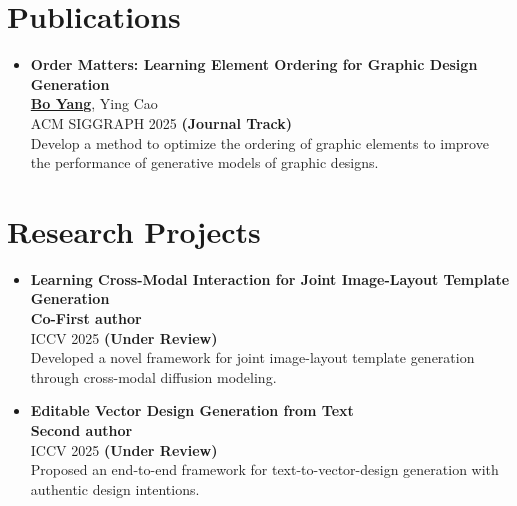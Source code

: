 \documentclass[letterpaper,11pt]{article}
\newcommand{\resumeItem}[1]{
  \item\small{
    {#1 \vspace{-2pt}}
  }
}
\newcommand{\resumeItemListStart}{\begin{itemize}}
\newcommand{\resumeItemListEnd}{\end{itemize}\vspace{-5pt}}
\begin{document}
\section{Publications}
    \resumeItemListStart
      \resumeItem{\textbf{Order Matters: Learning Element Ordering for Graphic Design Generation} \\
      \vspace{2pt}
      \underline{\textbf{Bo Yang}}, Ying Cao \\
      \vspace{2pt}
      ACM SIGGRAPH 2025 \textbf{(Journal Track)} \\
      \vspace{2pt}
      Develop a method to optimize the ordering of graphic elements to improve the performance of generative models of graphic designs.
      
      }
    \resumeItemListEnd
\vspace{-6pt}

\section{Research Projects}
    \resumeItemListStart
    
    \resumeItem{\textbf{Learning Cross-Modal Interaction for Joint Image-Layout Template Generation} \\
    \textbf{Co-First author} \\
    \vspace{2pt}
    ICCV 2025 \textbf{(Under Review)} \\
    \vspace{2pt} 
    Developed a novel framework for joint image-layout template generation through cross-modal diffusion modeling.
    }

    \resumeItem{\textbf{Editable Vector Design Generation from Text} \\
    \textbf{Second author} \\
    \vspace{2pt}
    ICCV 2025 \textbf{(Under Review)} \\
    \vspace{2pt} 
    Proposed an end-to-end framework for text-to-vector-design generation with authentic design intentions.
    }
    
    \resumeItemListEnd
\vspace{-6pt}
\end{document}
